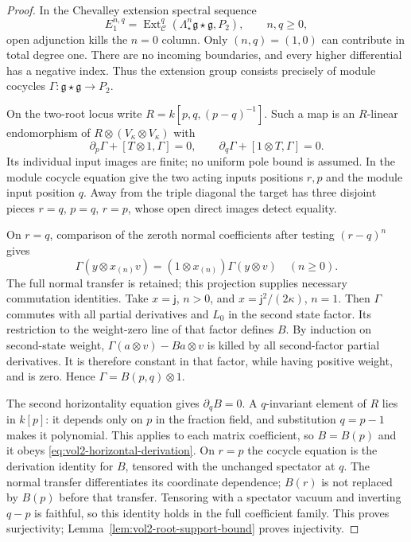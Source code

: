 \begin{proof}
In the Chevalley extension spectral sequence
\[
 E_1^{n,q}=\operatorname{Ext}^q_{\mathscr C}
      (\Lambda^n_\star\mathfrak g\star\mathfrak g,P_2),
 \qquad n,q\geq0,
\]
open adjunction kills the $n=0$ column. Only $(n,q)=(1,0)$
can contribute in total degree one. There are no incoming
boundaries, and every higher differential has a negative index.
Thus the extension group consists precisely of module cocycles
$\Gamma:\mathfrak g\star\mathfrak g\to P_2$.

On the two-root locus write $R=k[p,q,(p-q)^{-1}]$. Such a
map is an $R$-linear endomorphism of
$R\otimes(V_\kappa\otimes V_\kappa)$ with
\[
 \partial_p\Gamma+[T\otimes1,\Gamma]=0,
 \qquad\partial_q\Gamma+[1\otimes T,\Gamma]=0.
\]
Its individual input images are finite; no uniform pole bound
is assumed. In the module cocycle equation give the two acting
inputs positions $r,p$ and the module input position $q$.
Away from the triple diagonal the target has three disjoint
pieces $r=q$, $p=q$, $r=p$, whose open direct images detect
equality.

On $r=q$, comparison of the zeroth normal coefficients after
testing $(r-q)^n$ gives
\[
 \Gamma(y\otimes x_{(n)}v)=(1\otimes x_{(n)})\Gamma(y\otimes v)
 \quad(n\geq0).
\]
The full normal transfer is retained; this projection supplies
necessary commutation identities. Take $x=\mathsf j$, $n>0$,
and $x=\mathsf j^2/(2\kappa)$, $n=1$.
Then $\Gamma$ commutes with all partial derivatives and $L_0$
in the second state factor. Its restriction to the weight-zero
line of that factor defines $B$. By induction on second-state
weight, $\Gamma(a\otimes v)-Ba\otimes v$ is killed by all
second-factor partial derivatives. It is therefore constant
in that factor, while having positive weight, and is zero.
Hence $\Gamma=B(p,q)\otimes1$.

The second horizontality equation gives $\partial_qB=0$.
A $q$-invariant element of $R$ lies in $k[p]$: it depends only
on $p$ in the fraction field, and substitution $q=p-1$ makes
it polynomial. This applies to each matrix coefficient, so
$B=B(p)$ and it obeys \eqref{eq:vol2-horizontal-derivation}.
On $r=p$ the cocycle equation is the derivation identity for
$B$, tensored with the unchanged spectator at $q$. The normal
transfer differentiates its coordinate dependence; $B(r)$ is
not replaced by $B(p)$ before that transfer. Tensoring with a
spectator vacuum and inverting $q-p$ is faithful, so this
identity holds in the full coefficient family. This proves
surjectivity; Lemma~\ref{lem:vol2-root-support-bound} proves
injectivity.


\end{proof}
